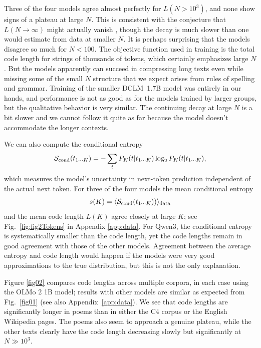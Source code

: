 \documentclass[aps,twocolumn,floats,prx]{revtex4}
\begin{document}
Three of the four models agree almost perfectly for $L(N > 10^3)$, and none show signs of a plateau at large $N$.  This is consistent with the conjecture that $L(N \rightarrow \infty)$ might actually vanish \cite{Hilberg_1990}, though the decay is much slower than one would estimate from data at smaller $N$.  It is perhaps surprising that the models disagree so much for $N < 100$. The objective function used in training is the total code length for strings of thousands of tokens, which certainly emphasizes large $N$.  But the models apparently can succeed in compressing long texts even while missing some of the small $N$ structure that we expect arises from rules of spelling and grammar.  Training of the smaller DCLM~1.7B model was entirely in our hands, and performance is not as good as for the models trained by larger groups, but the qualitative behavior is very similar.  The continuing decay at large $N$ is a bit slower and we cannot follow it quite as far because the model doesn't accommodate the longer contexts.  



We can also compute the conditional entropy  
\begin{equation}
{\cal S}_{\rm cond}(t_{1\cdots K}) = - \sum_t P_K(t |t_{1\cdots K})\log_2 P_K(t|t_{1\cdots K}),
\label{Scond1}
\end{equation}
which measures the model's uncertainty in next-token prediction independent of the actual next token.  For three of the four models the mean conditional entropy  
\begin{equation}
s(K) = \langle {\cal S}_{\rm cond}(t_{1\cdots K}) )\rangle_{\rm data} 
\end{equation}
and the mean code length $L(K)$ agree closely at large $K$; see Fig.~\ref{fig:fig2Tokens} in Appendix \ref{app:data}.  For Qwen3, the conditional entropy is systematically smaller than the  code length, yet the code lengths remain in good agreement with those of the other models.   Agreement between the average entropy and code length would happen if the models were very good approximations to the true distribution, but this is not the only explanation.  



Figure \ref{fig02} compares code lengths across multiple corpora, in each case using the OLMo 2 1B model; results with other models are similar as expected from Fig.~\ref{fig01} (see also Appendix~\ref{app:data}).  We see that code lengths are significantly longer in poems than in either the C4 corpus or the English Wikipedia pages.  The poems also seem to  approach a genuine plateau, while the other texts clearly have the code length decreasing slowly but significantly at $N\gg 10^3$.
\end{document}
